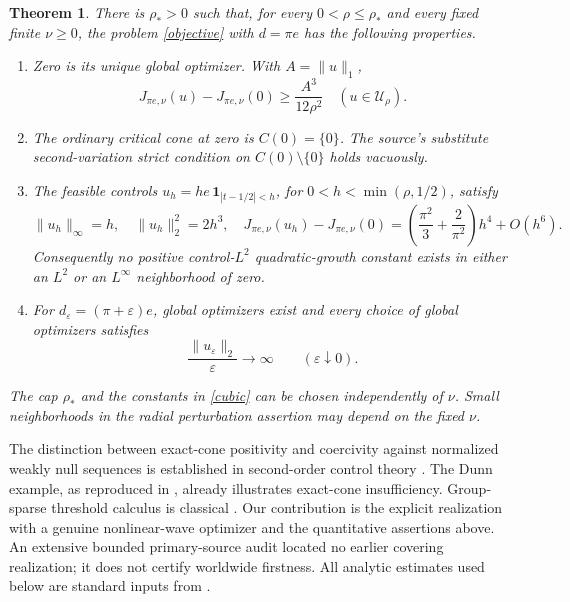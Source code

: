 \documentclass[11pt]{article}
\newtheorem{theorem}{Theorem}
\newcommand{\U}{\mathcal U_\rho}
\newcommand{\norm}[1]{\lVert #1\rVert}
\begin{document}
\begin{theorem}\label{main}
There is $\rho_*>0$ such that, for every $0<\rho\le\rho_*$ and every fixed
finite $\nu\ge0$, the problem \eqref{objective} with $d=\pi e$ has the
following properties.
\begin{enumerate}
\item Zero is its unique global optimizer. With $A=\norm u_1$,
\begin{equation}\label{cubic}
 J_{\pi e,\nu}(u)-J_{\pi e,\nu}(0)\ge\frac{A^3}{12\rho^2}
 \quad (u\in\U).
\end{equation}
\item The ordinary critical cone at zero is $C(0)=\{0\}$. The source's
substitute second-variation strict condition on $C(0)\setminus\{0\}$ holds
vacuously.
\item The feasible controls $u_h=h e\,\mathbf1_{|t-1/2|<h}$, for
$0<h<\min(\rho,1/2)$, satisfy
\begin{equation}\label{pulseclaim}
 \norm{u_h}_\infty=h,\quad \norm{u_h}_2^2=2h^3,\quad
 J_{\pi e,\nu}(u_h)-J_{\pi e,\nu}(0)
  =\left(\frac{\pi^2}{3}+\frac2{\pi^2}\right)h^4+O(h^6).
\end{equation}
Consequently no positive control-$L^2$ quadratic-growth constant exists
in either an $L^2$ or an $L^\infty$ neighborhood of zero.
\item For $d_\varepsilon=(\pi+\varepsilon)e$, global optimizers exist and
every choice of global optimizers satisfies
\begin{equation}\label{instability}
 \frac{\norm{u_\varepsilon}_2}{\varepsilon}\longrightarrow\infty
 \qquad(\varepsilon\downarrow0).
\end{equation}
\end{enumerate}
The cap $\rho_*$ and the constants in \eqref{cubic} can be chosen
independently of $\nu$. Small neighborhoods in the radial perturbation
assertion may depend on the fixed $\nu$.
\end{theorem}

The distinction between exact-cone positivity and coercivity against
normalized weakly null sequences is established in second-order control
theory \cite{CT12,CHW,CW,BW}. The Dunn example, as reproduced in
\cite[Example~4.16]{CT15}, already illustrates exact-cone insufficiency.
Group-sparse threshold calculus is classical \cite{HSW}. Our contribution
is the explicit realization with a genuine nonlinear-wave optimizer and
the quantitative assertions above. An extensive bounded primary-source
audit located no earlier covering realization; it does not certify
worldwide firstness. All analytic estimates used below are standard
inputs from \cite{KM}.
\end{document}
